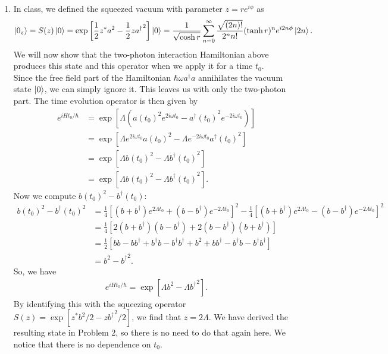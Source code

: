 \documentclass{article}
\theoremstyle{definition}
\newcommand{\f}[2]{\frac{#1}{#2}}
\newcommand{\lp}{\left(}
\newcommand{\rp}{\right)}
\newcommand{\lb}{\left[}
\newcommand{\rb}{\right]}
\begin{document}
\begin{enumerate}[label=(\alph*)]
\item In class, we defined the squeezed vacuum with parameter $z = re^{i\phi}$ as
\begin{align*}
\ket{0_z} = S(z)\ket{0} = \exp\lb \f{1}{2}z^* a^2 -\f{1}{2} z{a^\dagger}^2 \rb \ket{0} = 
\f{1}{\sqrt{\cosh r}} \sum_{n=0}^\infty \f{\sqrt{(2n)!}}{2^n n!}( \tanh r)^n e^{i 2n \phi } \ket{2n}.
\end{align*}
We will now show that the two-photon interaction Hamiltonian above produces this state and this operator when we apply it for a time $t_0$. \\

Since the free field part of the Hamiltonian $\hbar \omega a^\dagger a$ annihilates the vacuum state $\ket{0}$, we can simply ignore it. This leaves us with only the two-photon part. The time evolution operator is then given by 
\begin{align*}
e^{iHt_0/\hbar} 
&= \exp\lb \Lambda \lp {a(t_0)^2 e^{2i\omega t_0 } -  a^\dagger (t_0)}^2 e^{-2i \omega t_0 } \rp \rb \\
&= \exp\lb \Lambda e^{2i\omega t_0 }  a(t_0)^2 -   \Lambda e^{-2i \omega t_0 }  {a^\dagger(t_0)}^2  \rb \\
&=  \exp\lb \Lambda   b(t_0)^2 -   \Lambda   {b^\dagger(t_0)}^2  \rb \\ 
&= \exp\lb \Lambda   b(t_0)^2 -   \Lambda   {b^\dagger(t_0)}^2  \rb.
\end{align*}
Now we compute $b(t_0)^2 - b^\dagger(t_0)$:
\begin{align*}
b(t_0)^2 - b^\dagger(t_0)^2
&= \f{1}{4}\lb  (b + b^\dagger) e^{2\Lambda t_0} +(b- b^\dagger) e^{-2\Lambda t_0} \rb^2
-\f{1}{4}  \lb  (b + b^\dagger) e^{2\Lambda t_0} - (b- b^\dagger) e^{-2\Lambda t_0} \rb^2\\
&= \f{1}{4}\lb 2 (b+b^\dagger)(b - b^\dagger) + 2 (b-b^\dagger)(b+b^\dagger) \rb \\ 
&= \f{1}{2}\lb bb-bb^\dagger + b^\dagger b - b^\dagger b^\dagger + b^2 + bb^\dagger - b^\dagger b - b^\dagger b^\dagger \rb \\ 
&= b^2  - {b^\dagger}^2.
\end{align*}
 So, we have
 \begin{align*}
 e^{i Ht_0/\hbar} = \exp\lb \Lambda b^2 - \Lambda {b^\dagger}^2  \rb.
 \end{align*}
 By identifying this with the squeezing operator $S(z) = \exp[z^* b^2/2 - z{b^\dagger}^2/2]$, we find that $z = 2\Lambda$. We have derived the resulting state in Problem 2, so there is no need to do that again here. We notice that there is no dependence on $t_0$. 



\end{enumerate}
\end{document}
